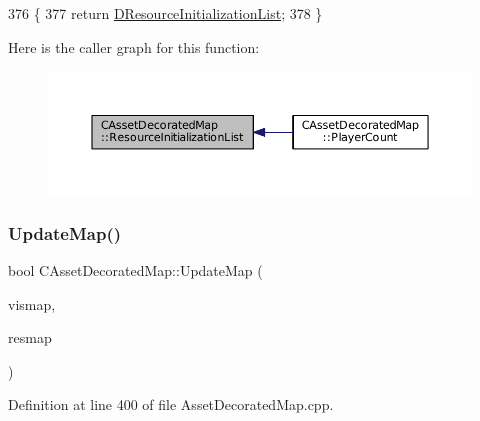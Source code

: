 \begin{DoxyCode}
376                                                                                                            
           \{
377     \textcolor{keywordflow}{return} \hyperlink{classCAssetDecoratedMap_ab4c78aeb90280ea98a3aa542cdb7f8cc}{DResourceInitializationList};
378 \}
\end{DoxyCode}
Here is the caller graph for this function\+:
\nopagebreak
\begin{figure}[H]
\begin{center}
\leavevmode
\includegraphics[width=350pt]{classCAssetDecoratedMap_a279fb55e5536131b599275e8629d51cd_icgraph}
\end{center}
\end{figure}
\hypertarget{classCAssetDecoratedMap_a7b594b6bef2eed8bbb0e4e4e6b855903}{}\label{classCAssetDecoratedMap_a7b594b6bef2eed8bbb0e4e4e6b855903} 
\subsubsection{\texorpdfstring{Update\+Map()}{UpdateMap()}}
{\footnotesize\ttfamily bool C\+Asset\+Decorated\+Map\+::\+Update\+Map (\begin{DoxyParamCaption}\item[{const \hyperlink{classCVisibilityMap}{C\+Visibility\+Map} \&}]{vismap,  }\item[{const \hyperlink{classCAssetDecoratedMap}{C\+Asset\+Decorated\+Map} \&}]{resmap }\end{DoxyParamCaption})}



Definition at line 400 of file Asset\+Decorated\+Map.\+cpp.


